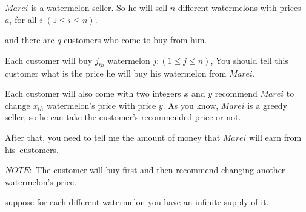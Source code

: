 $Marei$ is a watermelon seller. So he will sell $n$ different watermelons with prices $a_i$ for all $i$ $(1 \le i \le n)$.




and there are $q$ customers who come to buy from him.




Each customer will buy $j_{th}$  watermelon $j:(1\le j\le n)$, You should tell this customer what is the price he will buy his watermelon from $Marei$.

Each customer will also come with two integers $x$ and $y$ recommend $Marei$ to change $x_{th}$ watermelon's price with price $y$. As you know, $Marei$ is a greedy seller, so he can take the customer's recommended price or not.

After that, you need to tell me the amount of money that $Marei$ will earn from his customers.

$NOTE:$ The customer will buy first and then recommend changing another watermelon's price.

suppose for each different watermelon you have an infinite supply of it.